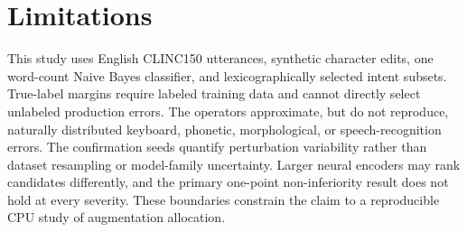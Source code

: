 \section*{Limitations}\label{paper:limstart}

This study uses English CLINC150 utterances, synthetic character edits, one word-count Naive Bayes classifier, and lexicographically selected intent subsets. True-label margins require labeled training data and cannot directly select unlabeled production errors. The operators approximate, but do not reproduce, naturally distributed keyboard, phonetic, morphological, or speech-recognition errors. The confirmation seeds quantify perturbation variability rather than dataset resampling or model-family uncertainty. Larger neural encoders may rank candidates differently, and the primary one-point non-inferiority result does not hold at every severity. These boundaries constrain the claim to a reproducible CPU study of augmentation allocation.
